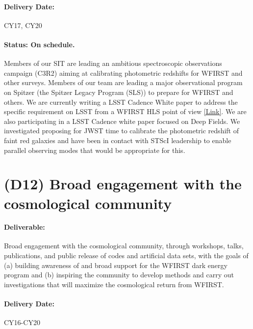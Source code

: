 \paragraph*{Delivery Date:} CY17, CY20

\paragraph*{Status: On schedule.} Members of our SIT are leading an ambitious spectroscopic observations campaign (C3R2) aiming at calibrating photometric redshifts
for WFIRST and other surveys. Members of our team are leading a major
observational program on Spitzer (the Spitzer Legacy Program (SLS)) to prepare for WFIRST and others. We are currently writing a LSST Cadence White paper to address the specific requirement on LSST from a WFIRST HLS point of view  \href{https://www.lsst.org/call-whitepaper-2018}{[Link]}. We are also participating in a LSST Cadence white paper focused on Deep Fields. We investigated proposing for JWST time to calibrate the photometric redshift of faint red galaxies \cite{Hemmati:2018} and have been in contact with STScI leadership to enable parallel observing modes that would be appropriate for this.



\section*{(D12) Broad engagement with the cosmological community}

\paragraph*{Deliverable:} Broad engagement with the cosmological community, through
workshops, talks, publications, and public release of codes and artificial data
sets, with the goals of (a) building awareness of and broad support for the
WFIRST dark energy program and (b) inspiring the community to develop methods
and carry out investigations that will maximize the cosmological return from
WFIRST.

\paragraph*{Delivery Date:} CY16-CY20

